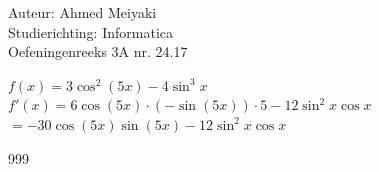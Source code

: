 \documentclass[a4paper]{article}
\begin{document}
  
\noindent \large Auteur: Ahmed Meiyaki \\
\noindent \large Studierichting: Informatica\\
\noindent \large Oefeningenreeks 3A nr. 24.17\\

\medskip

\normalsize

$f(x) = 3\cos^2\left(5x\right) - 4\sin^3x $\\

$f'(x) = 6\cos\left(5x\right) \cdot (-\sin\left(5x\right)) \cdot 5 - 12\sin^2 x \cos x $\\

$= -30\cos\left(5x\right)\sin\left(5x\right) - 12\sin^2 x \cos x $\\













\begin{thebibliography}{999}
\end{thebibliography}
\end{document}
